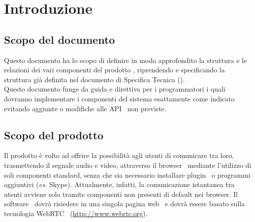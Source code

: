 \section{Introduzione}{
    \subsection{Scopo del documento}	{
Questo documento ha lo scopo di definire in modo approfondito la struttura e le relazioni dei vari componenti del prodotto \textbf{\mytalk}, riprendendo e specificando la struttura già definita nel documento di Specifica Tecnica (\emph{\SpecificaTecnica}).\\
Questo documento funge da guida e direttiva per i programmatori i quali dovranno implementare i componenti del sistema esattamente come indicato evitando aggiunte o modifiche alle API\g~ non previste.
    }
    
    \subsection{Scopo del prodotto}{
      Il prodotto \textbf{\mytalk} è volto ad offrire la possibilità agli utenti di comunicare tra loro, trasmettendo il segnale audio e video, attraverso 
      il browser\g~ mediante l'utilizzo di soli componenti standard, senza che sia necessario installare plugin\g~ o programmi aggiuntivi 
      (\textit{es.} Skype). Attualmente, infatti, la comunicazione istantanea tra utenti avviene solo tramite componenti non presenti di default nei
      browser\g . Il software\g~ dovrà risiedere in una singola pagina web\g~ e dovrà essere basato sulla tecnologia WebRTC\g~ 
      (\url {http://www.webrtc.org}).
    }

}
